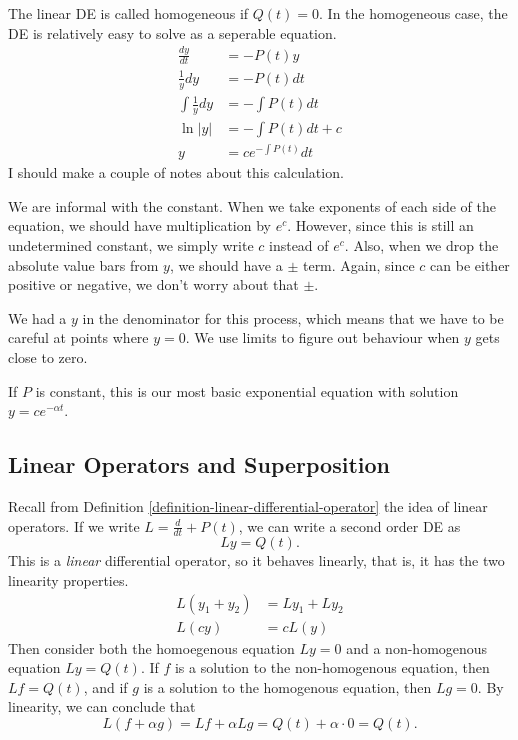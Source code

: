 \documentclass[fleqn,letterpaper]{report}
\begin{document}
The linear DE is called homogeneous if $Q(t) = 0$. In the
homogeneous case, the DE is relatively easy to solve as a
seperable equation.
\begin{align*}
\frac{dy}{dt} & = -P(t) y \\ 
\frac{1}{y} dy & = -P(t) dt \\
\int \frac{1}{y} dy & = -\int P(t) dt \\
\ln |y| & = -\int P(t) dt + c\\
y & = c e^{-\int P(t)} dt
\end{align*}
I should make a couple of notes about this calculation.
\begin{smallitemize} 
\item We are informal with the constant. When we take
exponents of each side of the equation, we should have
multiplication by $e^c$.  However, since this is still an
undetermined constant, we simply write $c$ instead of $e^c$.
Also, when we drop the absolute value bars from $y$, we should
have a $\pm$ term.  Again, since $c$ can be either positive or
negative, we don't worry about that $\pm$. 
\item We had a $y$ in the denominator for this process, which
means that we have to be careful at points where $y=0$. We use
limits to figure out behaviour when $y$ gets close to zero.
\item If $P$ is constant, this is our most basic exponential
equation with solution $y = ce^{-\alpha t}$.
\end{smallitemize}

\subsection{Linear Operators and Superposition}
\label{superposition}

Recall from Definition \ref{definition-linear-differential-operator}
the idea of linear operators. If we write $L = \frac{d}{dt} + P(t)$,
we can write a second order DE as
\begin{equation*}
L y = Q(t).
\end{equation*}
This is a \emph{linear} differential operator, so it behaves
linearly, that is, it has the two linearity properties.
\begin{align*}
L(y_1 + y_2) & = Ly_1 + Ly_2 \\
L(cy) & = cL(y) 
\end{align*}
Then consider both the homoegenous equation $Ly = 0$ and a
non-homogenous equation $Ly = Q(t)$. If $f$ is a solution to
the non-homogenous equation, then $Lf = Q(t)$, and if $g$ is a
solution to the homogenous equation, then $Lg = 0$. By
linearity, we can conclude that 
\begin{equation*}
L(f+\alpha g) = Lf + \alpha Lg = Q(t) + \alpha \cdot 0 = Q(t).
\end{equation*}
\end{document}
